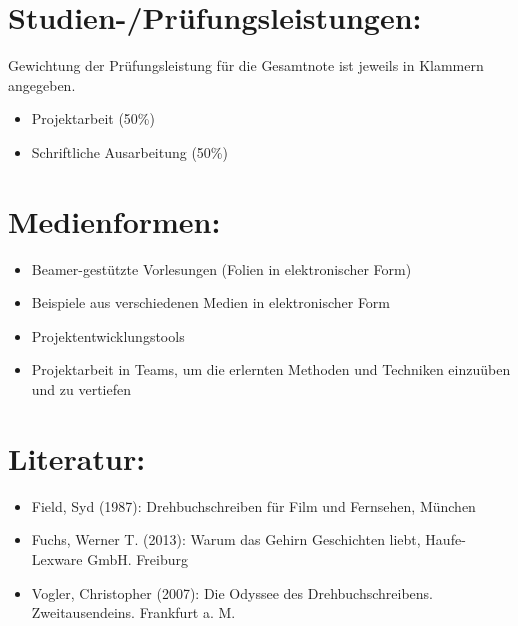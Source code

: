 \section*{Studien-/Prüfungsleistungen:\label{/mi-2017/modulbeschreibungen-master/MA_VC_Modul_Storytelling}}\label{studien-pruxfcfungsleistungenpathlabelmi-2017modulbeschreibungen-mastermaux5fvcux5fmodulux5fstorytelling}

Gewichtung der Prüfungsleistung für die Gesamtnote ist jeweils in
Klammern angegeben.

\begin{itemize}
\tightlist
\item
  Projektarbeit (50\%)
\item
  Schriftliche Ausarbeitung (50\%)
\end{itemize}

\section*{Medienformen:\label{/mi-2017/modulbeschreibungen-master/MA_VC_Modul_Storytelling}}\label{medienformenpathlabelmi-2017modulbeschreibungen-mastermaux5fvcux5fmodulux5fstorytelling}

\begin{itemize}
\tightlist
\item
  Beamer-gestützte Vorlesungen (Folien in elektronischer Form)
\item
  Beispiele aus verschiedenen Medien in elektronischer Form
\item
  Projektentwicklungstools
\item
  Projektarbeit in Teams, um die erlernten Methoden und Techniken
  einzuüben und zu vertiefen
\end{itemize}

\section*{Literatur:\label{/mi-2017/modulbeschreibungen-master/MA_VC_Modul_Storytelling}}\label{literaturpathlabelmi-2017modulbeschreibungen-mastermaux5fvcux5fmodulux5fstorytelling}

\begin{itemize}
\tightlist
\item
  Field, Syd (1987): Drehbuchschreiben für Film und Fernsehen, München
\item
  Fuchs, Werner T. (2013): Warum das Gehirn Geschichten liebt,
  Haufe-Lexware GmbH. Freiburg
\item
  Vogler, Christopher (2007): Die Odyssee des Drehbuchschreibens.
  Zweitausendeins. Frankfurt a. M.
\end{itemize}

